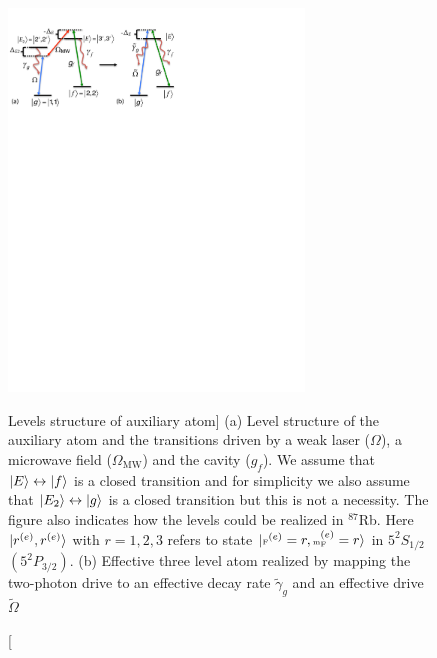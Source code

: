 \begin{figure}
\centering
\includegraphics[width=0.7\textwidth]{./figs_Borregaard_PRL2015/figureS2} 
\caption
[Levels structure of auxiliary atom]
{(a) Level structure of the auxiliary atom and the transitions driven by
a weak laser ($\Omega$), a microwave field ($\Omega_{\text{MW}}$) and the cavity
($g_{f}$). We assume that $| E \rangle\leftrightarrow| f \rangle$ is a closed transition
and for simplicity we also assume that $| E_{2} \rangle\leftrightarrow| g \rangle$ is a
closed transition but this is not a necessity. The figure also indicates how the
levels could be realized in ${}^{87}$Rb. Here $| r^{(e)},r^{(e)} \rangle$ with
$r=1,2,3$ refers to state $| \mbox{\tiny F}^{(e)}=r,\mbox{\tiny m}_{\mbox{\tiny F}}^{(e)}=r \rangle$
in $5^{2}S_{1/2}$ $(5^{2}P_{3/2})$. (b) Effective three level atom realized by
mapping the two-photon drive to an effective decay rate $\tilde{\gamma}_{g}$ and
an effective drive $\tilde{\Omega}$}
\label{fig:figureS2}
\end{figure} 


